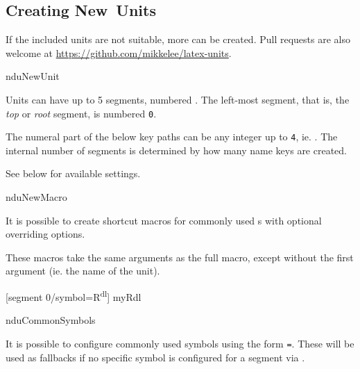 \documentclass{article}
\begin{document}
\subsection{Creating New Units} %

\label{units:new}
If the included units are not suitable, more can be created. Pull requests are also welcome at \url{https://github.com/mikkelee/latex-units}.

\begin{docCommand}
	{nduNewUnit}
	{}
	
Units can have up to 5 segments, numbered . The left-most segment, that is, the \emph{top} or \emph{root} segment, is numbered \texttt{0}.

The numeral part of the below key paths  can be any integer up to \texttt{4}, ie. . The internal number of segments is determined by how many name keys are created.

See below for available settings.

\end{docCommand}

\begin{docCommand}
	{nduNewMacro}
	{}

	It is possible to create shortcut macros for commonly used s with optional overriding options.

	These macros take the same arguments as the full  macro, except without the first argument (ie. the name of the unit).

\begin{dispExample}
	[segment 0/symbol={R\textsuperscript{dl}}]
	{myRdl}
\end{dispExample}

\end{docCommand}

\begin{docCommand}
	{nduCommonSymbols}
	{}

	It is possible to configure commonly used symbols using the form \texttt{=}. These will be used as fallbacks if no specific symbol is configured for a segment via .

\end{docCommand}
\end{document}
